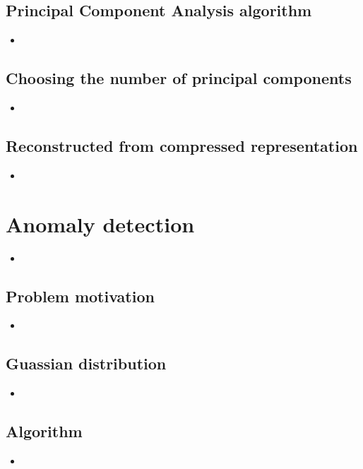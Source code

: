 \documentclass[13pt]{book}
\begin{document}
\section{Principal Component Analysis algorithm}
\begin{itemize}
  \item
\end{itemize}

\section{Choosing the number of principal components}
\begin{itemize}
  \item
\end{itemize}

\section{Reconstructed from compressed representation}
\begin{itemize}
  \item
\end{itemize}

\chapter{Anomaly detection}
\begin{itemize}
  \item
\end{itemize}

\section{Problem motivation}
\begin{itemize}
  \item
\end{itemize}

\section{Guassian distribution}
\begin{itemize}
  \item
\end{itemize}

\section{Algorithm}
\begin{itemize}
  \item
\end{itemize}
\end{document}
